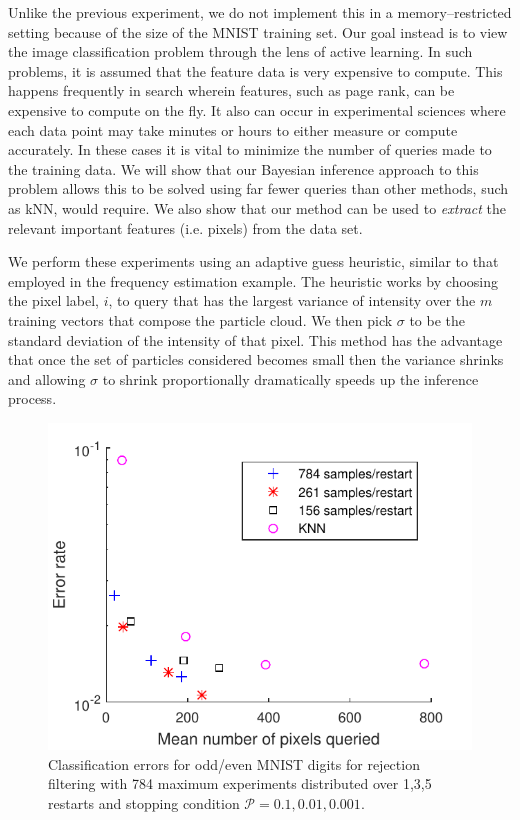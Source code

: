 \documentclass[twoside]{article}
\begin{document}
Unlike the previous experiment, we do not implement this in a memory--restricted
setting because of the size of the MNIST training set.
Our goal instead is to view the image classification problem through the lens of active learning.  In such
problems, it is assumed that the feature data is very expensive to compute.  This happens frequently
in search wherein features, such as page rank, can be expensive to compute on the fly.  It also can
occur in experimental sciences where each data point may take minutes or hours to either measure
or compute accurately.  In these cases it is vital to minimize the number of queries made to the training
data.  We will show that our Bayesian inference approach to this problem allows this to be solved using
far fewer queries than other methods, such as kNN, would require.  We also show that our method can
be used to \emph{extract} the relevant important features (i.e. pixels) from the data set.

We perform these experiments using an adaptive guess heuristic, similar to that employed in the frequency estimation example.
The heuristic works by choosing the pixel label, $i$, to query that has the largest variance of intensity
over the $m$ training vectors that compose the particle cloud.  We then pick $\sigma$ to be the standard
deviation of the intensity of that pixel.  This method has the advantage that once the set of particles
considered becomes small then the variance shrinks and allowing $\sigma$ to shrink proportionally dramatically
speeds up the inference process.  

\begin{figure}
\includegraphics[width=\columnwidth]{ErrorPlot.pdf}
\caption{Classification errors for odd/even MNIST digits for rejection filtering with 784 maximum experiments distributed over 1,3,5 restarts and stopping condition $\mathcal{P}=0.1,0.01,0.001$.}\label{fig:errorplot}
\end{figure}
\end{document}
